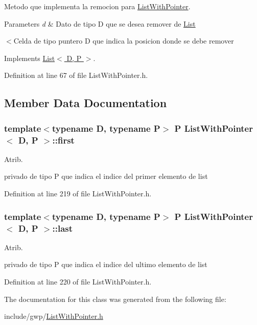 Metodo que implementa la remocion para \hyperlink{class_list_with_pointer}{List\+With\+Pointer}. 


\begin{DoxyParams}{Parameters}
{\em d} & Dato de tipo D que se desea remover de \hyperlink{class_list}{List} \\
\hline
\end{DoxyParams}
$<$Celda de tipo puntero D que indica la posicion donde se debe remover 

Implements \hyperlink{class_list_a14fc4e853102018df78db3899aa00d71}{List$<$ D, P $>$}.



Definition at line 67 of file List\+With\+Pointer.\+h.



\subsection{Member Data Documentation}
\hypertarget{class_list_with_pointer_a10f9bcf73fcff6ca7fae28bec209bd20}{
\subsubsection[{first}]{\setlength{\rightskip}{0pt plus 5cm}template$<$typename D, typename P$>$ P {\bf List\+With\+Pointer}$<$ {\bf D}, P $>$\+::first}}\label{class_list_with_pointer_a10f9bcf73fcff6ca7fae28bec209bd20}


Atrib. 

privado de tipo P que indica el indice del primer elemento de list 

Definition at line 219 of file List\+With\+Pointer.\+h.

\hypertarget{class_list_with_pointer_aa4ff3f43dffeb524dc1cf3ac5dfdb415}{
\subsubsection[{last}]{\setlength{\rightskip}{0pt plus 5cm}template$<$typename D, typename P$>$ P {\bf List\+With\+Pointer}$<$ {\bf D}, P $>$\+::last}}\label{class_list_with_pointer_aa4ff3f43dffeb524dc1cf3ac5dfdb415}


Atrib. 

privado de tipo P que indica el indice del ultimo elemento de list 

Definition at line 220 of file List\+With\+Pointer.\+h.



The documentation for this class was generated from the following file\+:\begin{DoxyCompactItemize}
\item 
include/gwp/\hyperlink{_list_with_pointer_8h}{List\+With\+Pointer.\+h}\end{DoxyCompactItemize}
